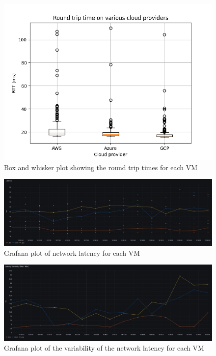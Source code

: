 \documentclass[11pt,a4paper]{article}
\begin{document}
\begin{figure}
\includegraphics[width=\textwidth]{boxplot.png}
\caption{Box and whisker plot showing the round trip times for each VM}
\label{boxplot}
\end{figure}

\begin{figure}
\includegraphics[width=\textwidth]{Latency.jpeg}
\caption{Grafana plot of network latency for each VM}
\label{latency}
\end{figure}

\begin{figure}
\includegraphics[width=\textwidth]{LatencyVar.jpeg}
\caption{Grafana plot of the variability of the network latency for each VM}
\label{latencyvar}
\end{figure}
\end{document}
